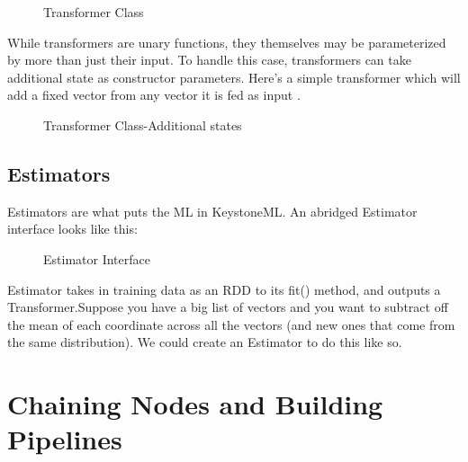 \documentclass[9pt,twocolumn,twoside]{styles/osajnl}
\begin{document}
\begin{figure}[htbp]
\centering
{}
\caption{Transformer Class}
\label{fig:Transformer Class}
\end{figure}

While transformers are unary functions, they themselves may be
parameterized by more than just their input. To handle this case,
transformers can take additional state as constructor
parameters. Here’s a simple transformer which will add a fixed vector
from any vector it is fed as input \cite{www-keystoneml1} .

\begin{figure}[htbp]
\centering
{}
\caption{Transformer Class-Additional states}
\label{fig:Transformer Class-Additional states}
\end{figure}

\subsection{Estimators}

Estimators are what puts the ML in KeystoneML. An abridged Estimator
interface looks like this:

\begin{figure}[htbp]
\centering
{}
\caption{Estimator Interface}
\label{fig:Estimator Interface}
\end{figure}

Estimator takes in training data as an RDD to its fit() method, and
outputs a Transformer.Suppose you have a big list of vectors and you
want to subtract off the mean of each coordinate across all the
vectors (and new ones that come from the same distribution). We could
create an Estimator to do this like so.

\section{Chaining Nodes and Building Pipelines}
\end{document}
